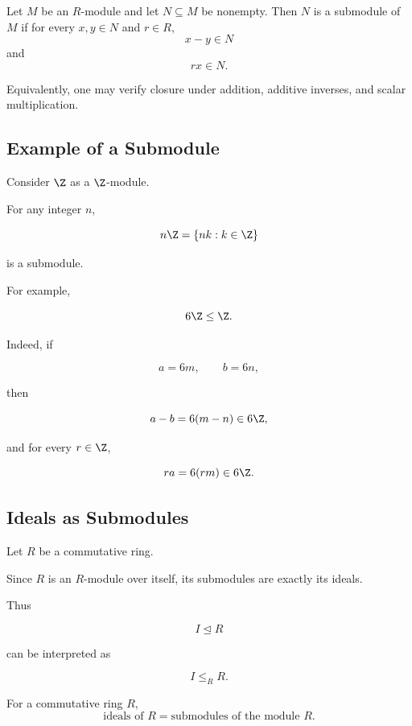 \begin{theorem}
Let \(M\) be an \(R\)-module and let \(N\subseteq M\) be nonempty. Then \(N\)
is a submodule of \(M\) if for every \(x,y\in N\) and \(r\in R\),
\[ x-y\in N \]
and
\[ rx\in N. \]
\end{theorem}

Equivalently, one may verify closure under addition, additive inverses, and
scalar multiplication.

\subsection{Example of a Submodule}
\label{subsec:submodule-example}

Consider \(\Z\) as a \(\Z\)-module.

For any integer \(n\),

\[ n\Z=\{nk:k\in\Z\} \]

is a submodule.

For example,

\[ 6\Z\leq\Z. \]

Indeed, if

\[ a=6m,\qquad b=6n, \]

then

\[ a-b=6(m-n)\in6\Z, \]

and for every \(r\in\Z\),

\[ ra=6(rm)\in6\Z. \]

\subsection{Ideals as Submodules}
\label{subsec:ideals-as-submodules}

Let \(R\) be a commutative ring.

Since \(R\) is an \(R\)-module over itself, its submodules are exactly its
ideals.

Thus

\[ I\trianglelefteq R \]

can be interpreted as

\[ I\leq_R R. \]

\begin{conceptbox}
For a commutative ring \(R\),
\[ \boxed{\text{ideals of }R=\text{submodules of the module }R.} \]
\end{conceptbox}

